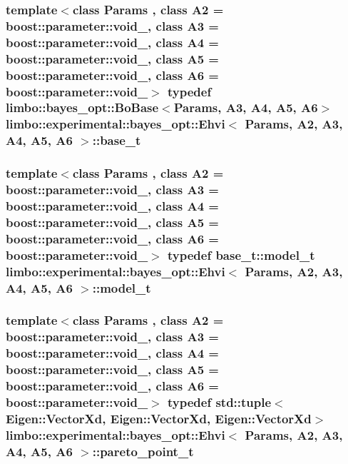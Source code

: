 \subsubsection[{base\+\_\+t}]{\setlength{\rightskip}{0pt plus 5cm}template$<$class Params , class A2  = boost\+::parameter\+::void\+\_\+, class A3  = boost\+::parameter\+::void\+\_\+, class A4  = boost\+::parameter\+::void\+\_\+, class A5  = boost\+::parameter\+::void\+\_\+, class A6  = boost\+::parameter\+::void\+\_\+$>$ typedef {\bf limbo\+::bayes\+\_\+opt\+::\+Bo\+Base}$<$Params, A3, A4, A5, A6$>$ {\bf limbo\+::experimental\+::bayes\+\_\+opt\+::\+Ehvi}$<$ Params, A2, A3, A4, A5, A6 $>$\+::{\bf base\+\_\+t}}\label{classlimbo_1_1experimental_1_1bayes__opt_1_1_ehvi_aab1a707afba4fe47658755ca5b66a77e}
\hypertarget{classlimbo_1_1experimental_1_1bayes__opt_1_1_ehvi_af9a1e49996eb15f36e08a7398e3b024e}{}
\subsubsection[{model\+\_\+t}]{\setlength{\rightskip}{0pt plus 5cm}template$<$class Params , class A2  = boost\+::parameter\+::void\+\_\+, class A3  = boost\+::parameter\+::void\+\_\+, class A4  = boost\+::parameter\+::void\+\_\+, class A5  = boost\+::parameter\+::void\+\_\+, class A6  = boost\+::parameter\+::void\+\_\+$>$ typedef {\bf base\+\_\+t\+::model\+\_\+t} {\bf limbo\+::experimental\+::bayes\+\_\+opt\+::\+Ehvi}$<$ Params, A2, A3, A4, A5, A6 $>$\+::{\bf model\+\_\+t}}\label{classlimbo_1_1experimental_1_1bayes__opt_1_1_ehvi_af9a1e49996eb15f36e08a7398e3b024e}
\hypertarget{classlimbo_1_1experimental_1_1bayes__opt_1_1_ehvi_a98176e0f540cebc76616142da6fbca6e}{}
\subsubsection[{pareto\+\_\+point\+\_\+t}]{\setlength{\rightskip}{0pt plus 5cm}template$<$class Params , class A2  = boost\+::parameter\+::void\+\_\+, class A3  = boost\+::parameter\+::void\+\_\+, class A4  = boost\+::parameter\+::void\+\_\+, class A5  = boost\+::parameter\+::void\+\_\+, class A6  = boost\+::parameter\+::void\+\_\+$>$ typedef std\+::tuple$<$Eigen\+::\+Vector\+Xd, Eigen\+::\+Vector\+Xd, Eigen\+::\+Vector\+Xd$>$ {\bf limbo\+::experimental\+::bayes\+\_\+opt\+::\+Ehvi}$<$ Params, A2, A3, A4, A5, A6 $>$\+::{\bf pareto\+\_\+point\+\_\+t}}\label{classlimbo_1_1experimental_1_1bayes__opt_1_1_ehvi_a98176e0f540cebc76616142da6fbca6e}


